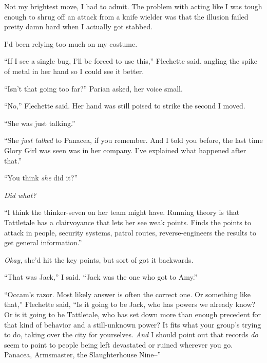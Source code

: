 





Not my brightest move, I had to admit.  The problem with acting like I was tough enough to shrug off an attack from a knife wielder was that the illusion failed pretty damn hard when I actually got stabbed.



I'd been relying too much on my costume.



``If I see a single bug, I'll be forced to use this,'' Flechette said, angling the spike of metal in her hand so I could see it better.



``Isn't that going too far?'' Parian asked, her voice small.



``No,'' Flechette said.  Her hand was still poised to strike the second I moved.



``She was just talking.''



``She \emph{just talked} to Panacea, if you remember.  And I told you before, the last time Glory Girl was seen was in her company.  I've explained what happened after that.''



``You think \emph{she} did it?''



\emph{Did what?}



``I think the thinker-seven on her team might have.  Running theory is that Tattletale has a clairvoyance that lets her see weak points.  Finds the points to attack in people, security systems, patrol routes, reverse-engineers the results to get general information.''



\emph{Okay, }she'd hit the key points, but sort of got it backwards.



``That was Jack,'' I said.  ``Jack was the one who got to Amy.''



``Occam's razor.  Most likely answer is often the correct one.  Or something like that,'' Flechette said,  ``Is it going to be Jack, who has powers we already know?  Or is it going to be Tattletale, who has set down more than enough precedent for that kind of behavior and a still-unknown power?  It fits what your group's trying to do, taking over the city for yourselves.  \emph{And} I should point out that records \emph{do }seem to point to people being left devastated or ruined wherever you go.  Panacea, Armsmaster, the Slaughterhouse Nine--''



